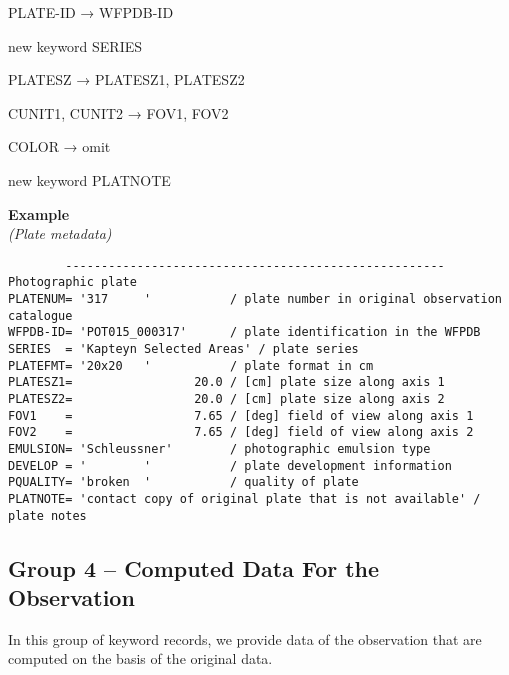 \documentclass[11pt]{ivoa}
\newenvironment{fitsexample}[1]
{\bigskip\noindent\textbf{Example}\\\textit{(#1\smallskip)}}
{\medskip}
\begin{document}
PLATE-ID → WFPDB-ID

new keyword SERIES

PLATESZ → PLATESZ1, PLATESZ2

CUNIT1, CUNIT2 → FOV1, FOV2

COLOR → omit

new keyword PLATNOTE


\begin{fitsexample}{Plate metadata}
\begin{lstlisting}
        ----------------------------------------------------- Photographic plate
PLATENUM= '317     '           / plate number in original observation catalogue
WFPDB-ID= 'POT015_000317'      / plate identification in the WFPDB
SERIES  = 'Kapteyn Selected Areas' / plate series
PLATEFMT= '20x20   '           / plate format in cm
PLATESZ1=                 20.0 / [cm] plate size along axis 1
PLATESZ2=                 20.0 / [cm] plate size along axis 2
FOV1    =                 7.65 / [deg] field of view along axis 1
FOV2    =                 7.65 / [deg] field of view along axis 2
EMULSION= 'Schleussner'        / photographic emulsion type
DEVELOP = '        '           / plate development information
PQUALITY= 'broken  '           / quality of plate
PLATNOTE= 'contact copy of original plate that is not available' / plate notes
\end{lstlisting}
\end{fitsexample}

\subsection{Group 4 – Computed Data For the Observation}

In this group of keyword records, we provide data of the observation
that are computed on the basis of the original data.
\end{document}
